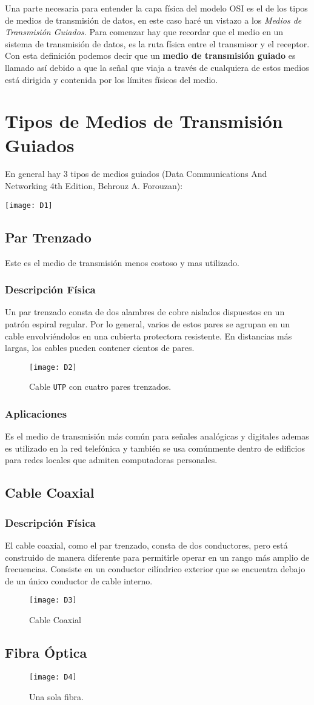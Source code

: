 Una parte necesaria para entender la capa física del modelo OSI es el de los tipos de medios de transmisión de datos, en este caso haré un vistazo a los \textit{Medios de Transmisión Guiados.} 
Para comenzar hay que recordar que el medio en un sistema de transmisión de datos, es la ruta física entre el transmisor y el receptor. Con esta definición podemos decir que un \textbf{medio de transmisión guiado} es llamado así debido a que la señal que viaja a través de cualquiera de estos medios está dirigida y contenida por los límites físicos del medio.
\section{Tipos de Medios de Transmisión Guiados}
En general hay 3 tipos de medios guiados (Data Communications And Networking 4th Edition, Behrouz A. Forouzan): \\
\begin{center}
\texttt{[image: D1]}
\end{center}
\subsection{Par Trenzado}
Este es el medio de transmisión menos costoso y mas utilizado.
\subsubsection{Descripción Física}
Un par trenzado consta de dos alambres de cobre aislados dispuestos en un patrón espiral regular.  Por lo general, varios de estos pares se agrupan en un cable envolviéndolos en una cubierta protectora resistente. En distancias más largas, los cables pueden contener cientos de pares.
\begin{figure}[!ht]
\centering
\texttt{[image: D2]}
\caption{Cable \texttt{UTP} con cuatro pares trenzados.}
\end{figure}
\subsubsection{Aplicaciones}
Es el medio de transmisión más común para señales analógicas y digitales ademas es utilizado en la red telefónica y también se usa comúnmente dentro de edificios para redes locales que admiten computadoras personales.
\subsection{Cable Coaxial}
\subsubsection{Descripción Física}
El cable coaxial, como el par trenzado, consta de dos conductores, pero está construido de manera diferente para permitirle operar en un rango más amplio de frecuencias. Consiste en un conductor cilíndrico exterior que se encuentra debajo de un único conductor de cable interno.
\begin{figure}[!ht]
\centering
\texttt{[image: D3]}
\caption{Cable Coaxial}
\end{figure}
\subsection{Fibra Óptica}
\begin{figure}[!ht]
\centering
\texttt{[image: D4]}
\caption{Una sola fibra.}
\end{figure}